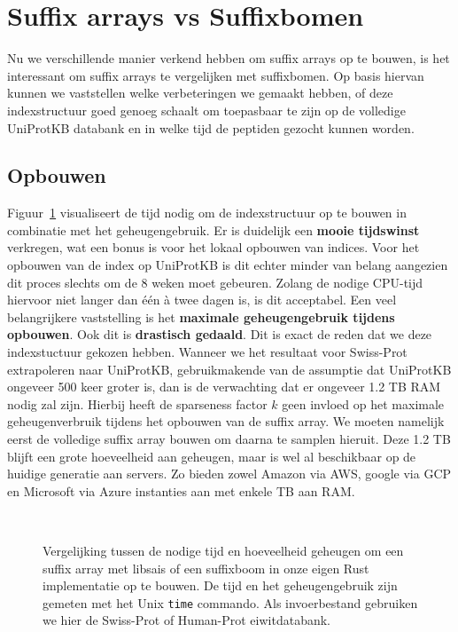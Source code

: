 \section{Suffix arrays vs Suffixbomen}\label{sec:performantie}
Nu we verschillende manier verkend hebben om suffix arrays op te bouwen, is het interessant om suffix arrays te vergelijken met suffixbomen.
Op basis hiervan kunnen we vaststellen welke verbeteringen we gemaakt hebben, of deze indexstructuur goed genoeg schaalt om toepasbaar te zijn op de volledige UniProtKB databank en in welke tijd de peptiden gezocht kunnen worden.

\subsection{Opbouwen}\label{subsec:opbouwen}
Figuur~\ref{fig:array_building} visualiseert de tijd nodig om de indexstructuur op te bouwen in combinatie met het geheugengebruik.
Er is duidelijk een \textbf{mooie tijdswinst} verkregen, wat een bonus is voor het lokaal opbouwen van indices.
Voor het opbouwen van de index op UniProtKB is dit echter minder van belang aangezien dit proces slechts om de 8 weken moet gebeuren.
Zolang de nodige CPU-tijd hiervoor niet langer dan één à twee dagen is, is dit acceptabel.
Een veel belangrijkere vaststelling is het \textbf{maximale geheugengebruik tijdens opbouwen}.
Ook dit is \textbf{drastisch gedaald}.
Dit is exact de reden dat we deze indexstuctuur gekozen hebben.
Wanneer we het resultaat voor Swiss-Prot extrapoleren naar UniProtKB, gebruikmakende van de assumptie dat UniProtKB ongeveer 500 keer groter is, dan is de verwachting dat er ongeveer 1.2 TB RAM nodig zal zijn.
Hierbij heeft de sparseness factor $k$ geen invloed op het maximale geheugenverbruik tijdens het opbouwen van de suffix array.
We moeten namelijk eerst de volledige suffix array bouwen om daarna te samplen hieruit.
Deze 1.2 TB blijft een grote hoeveelheid aan geheugen, maar is wel al beschikbaar op de huidige generatie aan servers.
Zo bieden zowel Amazon via AWS, google via GCP en Microsoft via Azure instanties aan met enkele TB aan RAM\@.

\begin{figure}[H]
    \centering
    \\[4ex] %

    \caption{Vergelijking tussen de nodige tijd en hoeveelheid geheugen om een suffix array met libsais of een suffixboom in onze eigen Rust implementatie op te bouwen. De tijd en het geheugengebruik zijn gemeten met het Unix \texttt{time} commando. Als invoerbestand gebruiken we hier de Swiss-Prot of Human-Prot eiwitdatabank.}\label{fig:array_building}
\end{figure}

